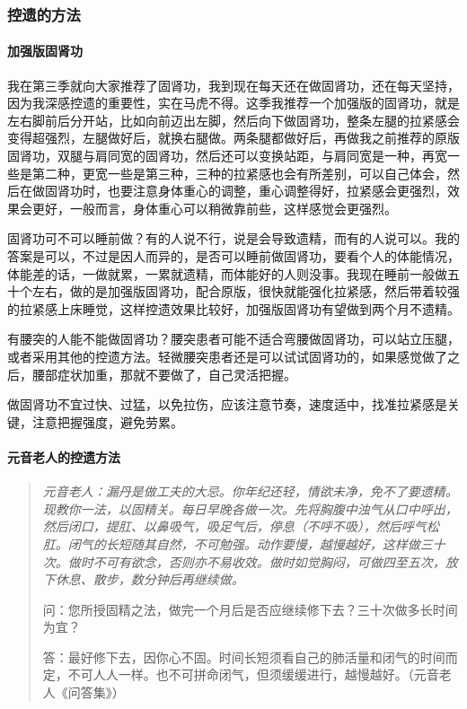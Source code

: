 \subsubsection{控遗的方法}

\paragraph{加强版固肾功}

我在第三季就向大家推荐了固肾功，我到现在每天还在做固肾功，还在每天坚持，因为我深感控遗的重要性，实在马虎不得。这季我推荐一个加强版的固肾功，就是左右脚前后分开站，比如向前迈出左脚，然后向下做固肾功，整条左腿的拉紧感会变得超强烈，左腿做好后，就换右腿做。两条腿都做好后，再做我之前推荐的原版固肾功，双腿与肩同宽的固肾功，然后还可以变换站距，与肩同宽是一种，再宽一些是第二种，更宽一些是第三种，三种的拉紧感也会有所差别，可以自己体会，然后在做固肾功时，也要注意身体重心的调整，重心调整得好，拉紧感会更强烈，效果会更好，一般而言，身体重心可以稍微靠前些，这样感觉会更强烈。

固肾功可不可以睡前做？有的人说不行，说是会导致遗精，而有的人说可以。我的答案是可以，不过是因人而异的，是否可以睡前做固肾功，要看个人的体能情况，体能差的话，一做就累，一累就遗精，而体能好的人则没事。我现在睡前一般做五十个左右，做的是加强版固肾功，配合原版，很快就能强化拉紧感，然后带着较强的拉紧感上床睡觉，这样控遗效果比较好，加强版固肾功有望做到两个月不遗精。

有腰突的人能不能做固肾功？腰突患者可能不适合弯腰做固肾功，可以站立压腿，或者采用其他的控遗方法。轻微腰突患者还是可以试试固肾功的，如果感觉做了之后，腰部症状加重，那就不要做了，自己灵活把握。

做固肾功不宜过快、过猛，以免拉伤，应该注意节奏，速度适中，找准拉紧感是关键，注意把握强度，避免劳累。

\paragraph{元音老人的控遗方法}

\begin{quotation}\it
    元音老人：漏丹是做工夫的大忌。你年纪还轻，情欲未净，免不了要遗精。现教你一法，以固精关。每日早晚各做一次。先将胸腹中浊气从口中呼出，然后闭口，提肛、以鼻吸气，吸足气后，停息（不呼不吸），然后呼气松肛。闭气的长短随其自然，不可勉强。动作要慢，越慢越好，这样做三十次。做时不可有欲念，否则亦不易收效。做时如觉胸闷，可做四至五次，放下休息、散步，数分钟后再继续做。

    问：您所授固精之法，做完一个月后是否应继续修下去？三十次做多长时间为宜？

    答：最好修下去，因你心不固。时间长短须看自己的肺活量和闭气的时间而定，不可人人一样。也不可拼命闭气，但须缓缓进行，越慢越好。（元音老人《问答集》）
\end{quotation}

